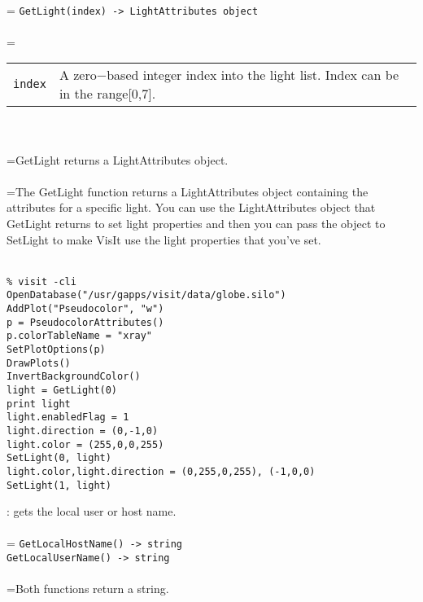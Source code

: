\documentclass[10pt,a4paper]{report}
\begin{document}
 \\ 
\hangindent=\parindent 
\verb!GetLight(index) -> LightAttributes object!\\ [-3mm]

 \\ 
\hangindent=\parindent 
\begin{tabular}{lp{9cm}}
\verb!index! & A zero$-$based integer index into the light list. Index can be in the range[0,7]. \\
\end{tabular} \\[-2mm]


 \\ 
\hangindent=\parindent GetLight returns a LightAttributes object. \\[-3mm] 

 \\ 
\hangindent=\parindent The GetLight function returns a LightAttributes object containing the attributes for a specific light. You can use the LightAttributes object that GetLight returns to set light properties and then you can pass the object to SetLight to make VisIt use the light properties that you've set. \\[-3mm] 

\\[-6mm]
\begin{verbatim}% visit -cli
OpenDatabase("/usr/gapps/visit/data/globe.silo")
AddPlot("Pseudocolor", "w")
p = PseudocolorAttributes()
p.colorTableName = "xray"
SetPlotOptions(p)
DrawPlots()
InvertBackgroundColor()
light = GetLight(0)
print light
light.enabledFlag = 1
light.direction = (0,-1,0)
light.color = (255,0,0,255)
SetLight(0, light)
light.color,light.direction = (0,255,0,255), (-1,0,0)
SetLight(1, light)
\end{verbatim}
\newpage


{}
: gets the local user or host name.\\[-3mm]

 \\ 
\hangindent=\parindent 
\verb!GetLocalHostName() -> string!\\ 
\verb!GetLocalUserName() -> string!\\ [-3mm]

 \\ 
\hangindent=\parindent Both functions return a string. \\[-3mm] 
\end{document}

